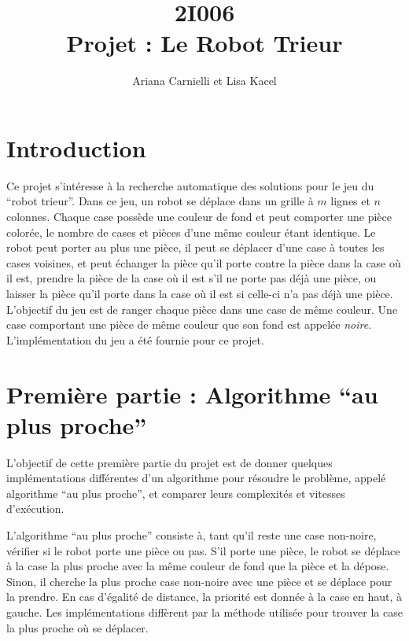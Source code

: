\documentclass[a4paper,12pt]{article}
\numberwithin{equation}{section}
\begin{document}
\title{2I006 \\ Projet : Le Robot Trieur}
\author{Ariana Carnielli et Lisa Kacel}
\date{}

\maketitle

\section{Introduction}

Ce projet s'intéresse à la recherche automatique des solutions pour le jeu du ``robot trieur''. Dans ce jeu, un robot se déplace dans un grille à $m$ lignes et $n$ colonnes. Chaque case possède une couleur de fond et peut comporter une pièce colorée, le nombre de cases et pièces d'une même couleur étant identique. Le robot peut porter au plus une pièce, il peut se déplacer d'une case à toutes les cases voisines, et peut échanger la pièce qu'il porte contre la pièce dans la case où il est, prendre la pièce de la case où il est s'il ne porte pas déjà une pièce, ou laisser la pièce qu'il porte dans la case où il est si celle-ci n'a pas déjà une pièce. L'objectif du jeu est de ranger chaque pièce dans une case de même couleur. Une case comportant une pièce de même couleur que son fond est appelée \emph{noire}. L'implémentation du jeu a été fournie pour ce projet.

\section{Première partie : Algorithme ``au plus proche''}
\label{SecAuPlusProche}

L'objectif de cette première partie du projet est de donner quelques implémentations différentes d'un algorithme pour résoudre le problème, appelé algorithme ``au plus proche'', et comparer leurs complexités et vitesses d'exécution.

L'algorithme ``au plus proche'' consiste à, tant qu'il reste une case non-noire, vérifier si le robot porte une pièce ou pas. S'il porte une pièce, le robot se déplace à la case la plus proche avec la même couleur de fond que la pièce et la dépose. Sinon, il cherche la plus proche case non-noire avec une pièce et se déplace pour la prendre. En cas d'égalité de distance, la priorité est donnée à la case en haut, à gauche. Les implémentations diffèrent par la méthode utilisée pour trouver la case la plus proche où se déplacer.
\end{document}
